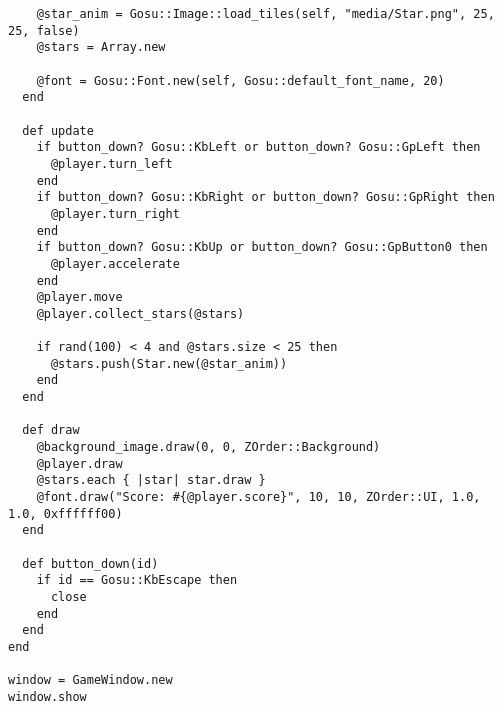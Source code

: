 \begin{latexonly}
\begin{lstlisting}
    @star_anim = Gosu::Image::load_tiles(self, "media/Star.png", 25, 25, false)
    @stars = Array.new
    
    @font = Gosu::Font.new(self, Gosu::default_font_name, 20)
  end

  def update
    if button_down? Gosu::KbLeft or button_down? Gosu::GpLeft then
      @player.turn_left
    end
    if button_down? Gosu::KbRight or button_down? Gosu::GpRight then
      @player.turn_right
    end
    if button_down? Gosu::KbUp or button_down? Gosu::GpButton0 then
      @player.accelerate
    end
    @player.move
    @player.collect_stars(@stars)
    
    if rand(100) < 4 and @stars.size < 25 then
      @stars.push(Star.new(@star_anim))
    end
  end

  def draw
    @background_image.draw(0, 0, ZOrder::Background)
    @player.draw
    @stars.each { |star| star.draw }
    @font.draw("Score: #{@player.score}", 10, 10, ZOrder::UI, 1.0, 1.0, 0xffffff00)
  end

  def button_down(id)
    if id == Gosu::KbEscape then
      close
    end
  end
end

window = GameWindow.new
window.show

    \end{lstlisting}
  \end{latexonly}
